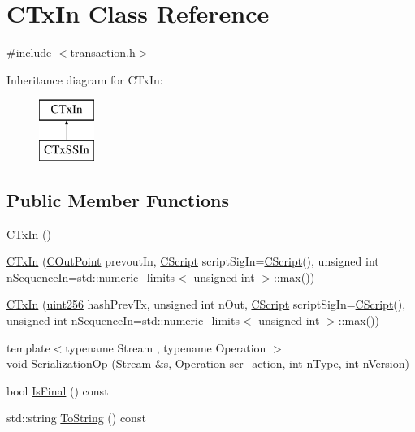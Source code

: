 \hypertarget{class_c_tx_in}{}\section{C\+Tx\+In Class Reference}
\label{class_c_tx_in}


{\ttfamily \#include $<$transaction.\+h$>$}

Inheritance diagram for C\+Tx\+In\+:\begin{figure}[H]
\begin{center}
\leavevmode
\includegraphics[height=2.000000cm]{class_c_tx_in}
\end{center}
\end{figure}
\subsection*{Public Member Functions}
\begin{DoxyCompactItemize}
\item 
\hyperlink{class_c_tx_in_abcf9f5a65b0a016b31912f4cd1f32c73}{C\+Tx\+In} ()
\item 
\hyperlink{class_c_tx_in_a243c4c394d5534ed10999b31d025be13}{C\+Tx\+In} (\hyperlink{class_c_out_point}{C\+Out\+Point} prevout\+In, \hyperlink{class_c_script}{C\+Script} script\+Sig\+In=\hyperlink{class_c_script}{C\+Script}(), unsigned int n\+Sequence\+In=std\+::numeric\+\_\+limits$<$ unsigned int $>$\+::max())
\item 
\hyperlink{class_c_tx_in_a168382e68612df987e0241740771ab4e}{C\+Tx\+In} (\hyperlink{classuint256}{uint256} hash\+Prev\+Tx, unsigned int n\+Out, \hyperlink{class_c_script}{C\+Script} script\+Sig\+In=\hyperlink{class_c_script}{C\+Script}(), unsigned int n\+Sequence\+In=std\+::numeric\+\_\+limits$<$ unsigned int $>$\+::max())
\item 
{\footnotesize template$<$typename Stream , typename Operation $>$ }\\void \hyperlink{class_c_tx_in_a3d23c5264c6d93ecf3cf65dd13c55db3}{Serialization\+Op} (Stream \&s, Operation ser\+\_\+action, int n\+Type, int n\+Version)
\item 
bool \hyperlink{class_c_tx_in_aa8110f711e2cdecff45c294ba2ee0a26}{Is\+Final} () const 
\item 
std\+::string \hyperlink{class_c_tx_in_aeac9b3abd4b2d81e9ec4401d1383778d}{To\+String} () const 
\end{DoxyCompactItemize}
